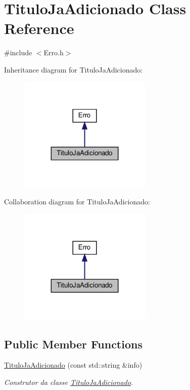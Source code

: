 \hypertarget{classTituloJaAdicionado}{}\section{Titulo\+Ja\+Adicionado Class Reference}
\label{classTituloJaAdicionado}


{\ttfamily \#include $<$Erro.\+h$>$}



Inheritance diagram for Titulo\+Ja\+Adicionado\+:
\nopagebreak
\begin{figure}[H]
\begin{center}
\leavevmode
\includegraphics[width=179pt]{classTituloJaAdicionado__inherit__graph}
\end{center}
\end{figure}


Collaboration diagram for Titulo\+Ja\+Adicionado\+:
\nopagebreak
\begin{figure}[H]
\begin{center}
\leavevmode
\includegraphics[width=179pt]{classTituloJaAdicionado__coll__graph}
\end{center}
\end{figure}
\subsection*{Public Member Functions}
\begin{DoxyCompactItemize}
\item 
\hyperlink{classTituloJaAdicionado_af041846009d91525ed739142e61ca035}{Titulo\+Ja\+Adicionado} (const std\+::string \&info)
\begin{DoxyCompactList}\small\item\em Construtor da classe \hyperlink{classTituloJaAdicionado}{Titulo\+Ja\+Adicionado}. \end{DoxyCompactList}\end{DoxyCompactItemize}


